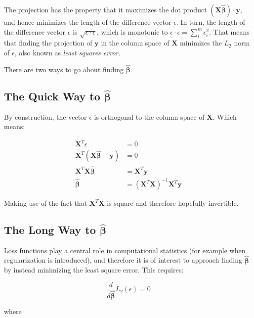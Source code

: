 The projection has the property that it maximizes the dot product $(\mathbf{X}\mathbf{\hat{\beta}})\cdot \mathbf{y}$, and hence minimizes the length of the difference vector $\epsilon$. In turn, the length of the difference vector $\epsilon$ is $\sqrt{\epsilon\cdot\epsilon}$, which is monotonic to $\epsilon\cdot\epsilon = \sum^m_i \epsilon_i^2$. That means that finding the projection of $\mathbf{y}$ in the column space of $\mathbf{X}$ minimizes the  $L_2$ norm of $\epsilon$, also known as \textit{least squares error}.

There are two ways to go about finding $\mathbf{\hat{\beta}}$.

\subsection{The Quick Way to $\mathbf{\hat{\beta}}$}

By construction, the vector $\epsilon$ is orthogonal to the column space of $\mathbf{X}$. Which means:

\begin{equation}
\begin{array}{rl}
\mathbf{X}^T\epsilon &= 0\\
\mathbf{X}^T\left(\mathbf{X}\mathbf{\hat{\beta}}-\mathbf{y}\right) &= 0\\
\mathbf{X}^T\mathbf{X}\mathbf{\hat{\beta}} &= \mathbf{X}^T\mathbf{y}\\
\mathbf{\hat{\beta}} &= \left(\mathbf{X}^T\mathbf{X}\right)^{-1}\mathbf{X}^T\mathbf{y}
\end{array}
\end{equation}

Making use of the fact that $\mathbf{X}^T\mathbf{X}$ is square and therefore hopefully invertible.

\subsection{The Long Way to $\mathbf{\hat{\beta}}$}

Loss functions play a central role in computational statistics (for example when regularization is introduced), and therefore it is of interest to approach finding $\mathbf{\hat{\beta}}$ by instead minimizing the least square error. This requires:

\begin{equation}
\frac{d}{d\mathbf{\hat{\beta}}}L_2(\epsilon) = 0
\end{equation}

where

